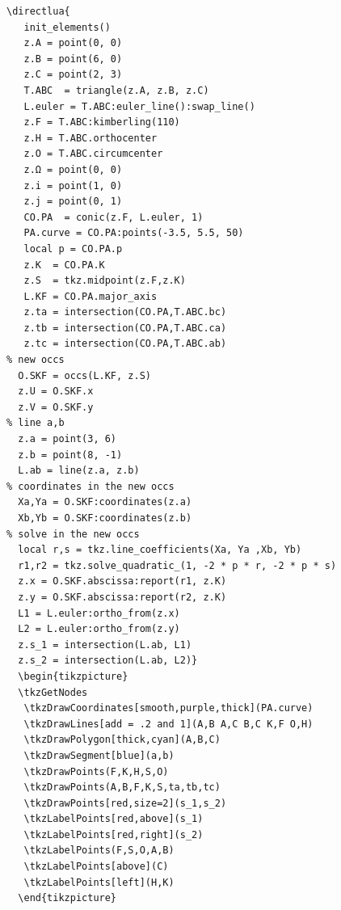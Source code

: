 \begin{verbatim}
\directlua{
   init_elements()
   z.A = point(0, 0)
   z.B = point(6, 0)
   z.C = point(2, 3)
   T.ABC  = triangle(z.A, z.B, z.C)
   L.euler = T.ABC:euler_line():swap_line()
   z.F = T.ABC:kimberling(110)
   z.H = T.ABC.orthocenter
   z.O = T.ABC.circumcenter
   z.Ω = point(0, 0)
   z.i = point(1, 0)
   z.j = point(0, 1)
   CO.PA  = conic(z.F, L.euler, 1)
   PA.curve = CO.PA:points(-3.5, 5.5, 50)
   local p = CO.PA.p
   z.K  = CO.PA.K
   z.S  = tkz.midpoint(z.F,z.K)
   L.KF = CO.PA.major_axis
   z.ta = intersection(CO.PA,T.ABC.bc)
   z.tb = intersection(CO.PA,T.ABC.ca)
   z.tc = intersection(CO.PA,T.ABC.ab)
% new occs
  O.SKF = occs(L.KF, z.S)
  z.U = O.SKF.x
  z.V = O.SKF.y
% line a,b
  z.a = point(3, 6)
  z.b = point(8, -1)
  L.ab = line(z.a, z.b)
% coordinates in the new occs
  Xa,Ya = O.SKF:coordinates(z.a)
  Xb,Yb = O.SKF:coordinates(z.b)
% solve in the new occs
  local r,s = tkz.line_coefficients(Xa, Ya ,Xb, Yb)
  r1,r2 = tkz.solve_quadratic_(1, -2 * p * r, -2 * p * s)
  z.x = O.SKF.abscissa:report(r1, z.K)
  z.y = O.SKF.abscissa:report(r2, z.K)
  L1 = L.euler:ortho_from(z.x)
  L2 = L.euler:ortho_from(z.y)
  z.s_1 = intersection(L.ab, L1)
  z.s_2 = intersection(L.ab, L2)}
  \begin{tikzpicture}
  \tkzGetNodes
   \tkzDrawCoordinates[smooth,purple,thick](PA.curve)
   \tkzDrawLines[add = .2 and 1](A,B A,C B,C K,F O,H)
   \tkzDrawPolygon[thick,cyan](A,B,C)
   \tkzDrawSegment[blue](a,b)
   \tkzDrawPoints(F,K,H,S,O)
   \tkzDrawPoints(A,B,F,K,S,ta,tb,tc)
   \tkzDrawPoints[red,size=2](s_1,s_2)
   \tkzLabelPoints[red,above](s_1)
   \tkzLabelPoints[red,right](s_2)
   \tkzLabelPoints(F,S,O,A,B)
   \tkzLabelPoints[above](C)
   \tkzLabelPoints[left](H,K)
  \end{tikzpicture}
\end{verbatim}


